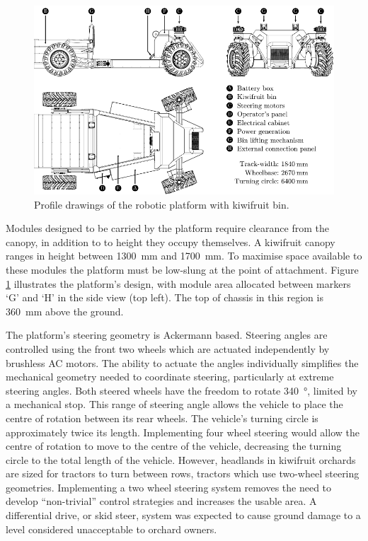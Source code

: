 \documentclass[preprint,authoryear,12pt]{elsarticle}
\begin{document}
        \begin{figure}[htb]
            \centering
            \includegraphics[width=\linewidth]{imgs/profile_views/AMMP-All-Labelled.pdf}
            \caption{Profile drawings of the robotic platform with kiwifruit bin.}
            \label{fig:AMMP}
        \end{figure}

        Modules designed to be carried by the platform require clearance from the canopy, in addition to to height they occupy themselves.
        A kiwifruit canopy ranges in height between \SI{1300}{\milli\meter} and \SI{1700}{\milli\meter}.
        To maximise space available to these modules the platform must be low-slung at the point of attachment.
        Figure \ref{fig:AMMP} illustrates the platform's design, with module area allocated between markers `G' and `H' in the side view (top left).
        The top of chassis in this region is \SI{360}{\milli\meter} above the ground.

        The platform's steering geometry is Ackermann based.
        Steering angles are controlled using the front two wheels which are actuated independently by brushless AC motors.
        The ability to actuate the angles individually simplifies the mechanical geometry needed to coordinate steering, particularly at extreme steering angles.
        Both steered wheels have the freedom to rotate \SI{340}{\degree}, limited by a mechanical stop.
        This range of steering angle allows the vehicle to place the centre of rotation between its rear wheels.
        The vehicle's turning circle is approximately twice its length.
        Implementing four wheel steering would allow the centre of rotation to move to the centre of the vehicle, decreasing the turning circle to the total length of the vehicle.
        However, headlands in kiwifruit orchards are sized for tractors to turn between rows, tractors which use two-wheel steering geometries.
        Implementing a two wheel steering system removes the need to develop ``non-trivial'' control strategies and increases the usable area.
        A differential drive, or skid steer, system was expected to cause ground damage to a level considered unacceptable to orchard owners.
\end{document}
